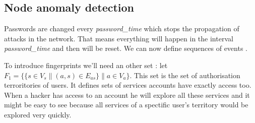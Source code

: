 \documentclass[11pt]{article}
\begin{document}
\subsection{Node anomaly detection}

Passwords are changed every \textit{password\_time} which stops the propagation of attacks in the network. That means everything will happen in the interval \textit{password\_time} and then will be reset. We can now define sequences of events \cite{node}. 

To introduce fingerprints we'll need an other set : let $F_1 = \{ \{s\in V_s \| (a,s) \in E_{as}\} \| a\in V_a\}$. This set is the set of authorisation terroritories of users. It defines sets of services accounts have exactly access too. When a hacker has access to an account he will explore all these services and it might be easy to see because all services of a spectific user's territory would be explored very quickly.
\end{document}

